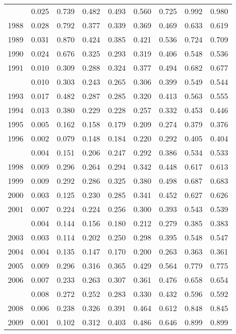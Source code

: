 \documentclass[
]{article}
\begin{document}
\begin{longtable}[t]{lrrrrrrrr}
\endfoot
\bottomrule
\endlastfoot
1987 & 0.025 & 0.739 & 0.482 & 0.493 & 0.560 & 0.725 & 0.992 & 0.980\\
1988 & 0.028 & 0.792 & 0.377 & 0.339 & 0.369 & 0.469 & 0.633 & 0.619\\
1989 & 0.031 & 0.870 & 0.424 & 0.385 & 0.421 & 0.536 & 0.724 & 0.709\\
1990 & 0.024 & 0.676 & 0.325 & 0.293 & 0.319 & 0.406 & 0.548 & 0.536\\
1991 & 0.010 & 0.309 & 0.288 & 0.324 & 0.377 & 0.494 & 0.682 & 0.677\\
\addlinespace
1992 & 0.010 & 0.303 & 0.243 & 0.265 & 0.306 & 0.399 & 0.549 & 0.544\\
1993 & 0.017 & 0.482 & 0.287 & 0.285 & 0.320 & 0.413 & 0.563 & 0.555\\
1994 & 0.013 & 0.380 & 0.229 & 0.228 & 0.257 & 0.332 & 0.453 & 0.446\\
1995 & 0.005 & 0.162 & 0.158 & 0.179 & 0.209 & 0.274 & 0.379 & 0.376\\
1996 & 0.002 & 0.079 & 0.148 & 0.184 & 0.220 & 0.292 & 0.405 & 0.404\\
\addlinespace
1997 & 0.004 & 0.151 & 0.206 & 0.247 & 0.292 & 0.386 & 0.534 & 0.533\\
1998 & 0.009 & 0.296 & 0.264 & 0.294 & 0.342 & 0.448 & 0.617 & 0.613\\
1999 & 0.009 & 0.292 & 0.286 & 0.325 & 0.380 & 0.498 & 0.687 & 0.683\\
2000 & 0.003 & 0.125 & 0.230 & 0.285 & 0.341 & 0.452 & 0.627 & 0.626\\
2001 & 0.007 & 0.224 & 0.224 & 0.256 & 0.300 & 0.393 & 0.543 & 0.539\\
\addlinespace
2002 & 0.004 & 0.144 & 0.156 & 0.180 & 0.212 & 0.279 & 0.385 & 0.383\\
2003 & 0.003 & 0.114 & 0.202 & 0.250 & 0.298 & 0.395 & 0.548 & 0.547\\
2004 & 0.004 & 0.135 & 0.147 & 0.170 & 0.200 & 0.263 & 0.363 & 0.361\\
2005 & 0.009 & 0.296 & 0.316 & 0.365 & 0.429 & 0.564 & 0.779 & 0.775\\
2006 & 0.007 & 0.233 & 0.263 & 0.307 & 0.361 & 0.476 & 0.658 & 0.654\\
\addlinespace
2007 & 0.008 & 0.272 & 0.252 & 0.283 & 0.330 & 0.432 & 0.596 & 0.592\\
2008 & 0.006 & 0.238 & 0.326 & 0.391 & 0.464 & 0.612 & 0.848 & 0.845\\
2009 & 0.001 & 0.102 & 0.312 & 0.403 & 0.486 & 0.646 & 0.899 & 0.899\\

\end{longtable}
\end{document}
